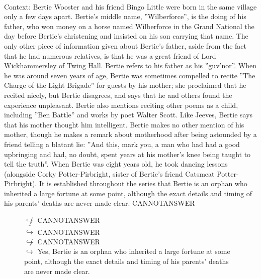 \documentclass[11pt,a4paper, onecolumn]{article}
\begin{document}
\\ Context: Bertie Wooster and his friend Bingo Little were born in the same village only a few days apart. Bertie's middle name, ''Wilberforce'', is the doing of his father, who won money on a horse named Wilberforce in the Grand National the day before Bertie's christening and insisted on his son carrying that name. The only other piece of information given about Bertie's father, aside from the fact that he had numerous relatives, is that he was a great friend of Lord Wickhammersley of Twing Hall. Bertie refers to his father as his ''guv'nor''. When he was around seven years of age, Bertie was sometimes compelled to recite ''The Charge of the Light Brigade'' for guests by his mother; she proclaimed that he recited nicely, but Bertie disagrees, and says that he and others found the experience unpleasant. Bertie also mentions reciting other poems as a child, including ''Ben Battle'' and works by poet Walter Scott. Like Jeeves, Bertie says that his mother thought him intelligent. Bertie makes no other mention of his mother, though he makes a remark about motherhood after being astounded by a friend telling a blatant lie: ''And this, mark you, a man who had had a good upbringing and had, no doubt, spent years at his mother's knee being taught to tell the truth''. When Bertie was eight years old, he took dancing lessons (alongside Corky Potter-Pirbright, sister of Bertie's friend Catsmeat Potter-Pirbright). It is established throughout the series that Bertie is an orphan who inherited a large fortune at some point, although the exact details and timing of his parents' deaths are never made clear. CANNOTANSWER

\begin{figure}[t] \small \begin{tcolorbox}[boxsep=0pt,left=5pt,right=0pt,top=2pt,colback = yellow!5] \begin{dialogue}
 \small 
\colorbox{pink!25}{$\not\hookrightarrow$}
{ CANNOTANSWER }
\\
\colorbox{pink!25}{ $\bar{\hookrightarrow}$}
{ CANNOTANSWER }
\\
\colorbox{pink!25}{$\not\hookrightarrow$}
{ CANNOTANSWER }
\\
\colorbox{pink!25}{$\hookrightarrow$}
\colorbox{red!25}{Yes,}
{ Bertie is an orphan who inherited a large fortune at some point, although the exact details and timing of his parents' deaths are never made clear. }
\\
 \end{dialogue}\end{tcolorbox}\end{figure}
\end{document}
